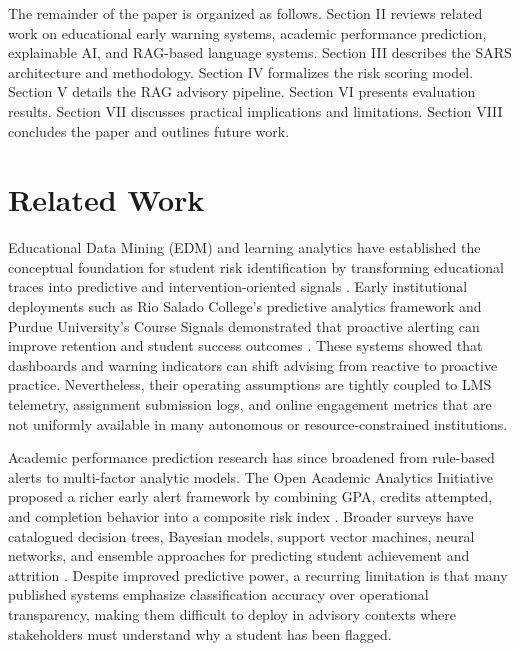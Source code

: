 \documentclass[conference]{IEEEtran}
\begin{document}
The remainder of the paper is organized as follows. Section II reviews related work on educational early warning systems, academic performance prediction, explainable AI, and RAG-based language systems. Section III describes the SARS architecture and methodology. Section IV formalizes the risk scoring model. Section V details the RAG advisory pipeline. Section VI presents evaluation results. Section VII discusses practical implications and limitations. Section VIII concludes the paper and outlines future work.

\section{Related Work}
Educational Data Mining (EDM) and learning analytics have established the conceptual foundation for student risk identification by transforming educational traces into predictive and intervention-oriented signals \cite{baker2014edm}. Early institutional deployments such as Rio Salado College's predictive analytics framework and Purdue University's Course Signals demonstrated that proactive alerting can improve retention and student success outcomes \cite{essa2012predictive,arnold2012course}. These systems showed that dashboards and warning indicators can shift advising from reactive to proactive practice. Nevertheless, their operating assumptions are tightly coupled to LMS telemetry, assignment submission logs, and online engagement metrics that are not uniformly available in many autonomous or resource-constrained institutions.

Academic performance prediction research has since broadened from rule-based alerts to multi-factor analytic models. The Open Academic Analytics Initiative proposed a richer early alert framework by combining GPA, credits attempted, and completion behavior into a composite risk index \cite{jayaprakash2014early}. Broader surveys have catalogued decision trees, Bayesian models, support vector machines, neural networks, and ensemble approaches for predicting student achievement and attrition \cite{romero2020survey,hussain2019predicting,summers2021predicting}. Despite improved predictive power, a recurring limitation is that many published systems emphasize classification accuracy over operational transparency, making them difficult to deploy in advisory contexts where stakeholders must understand why a student has been flagged.
\end{document}

